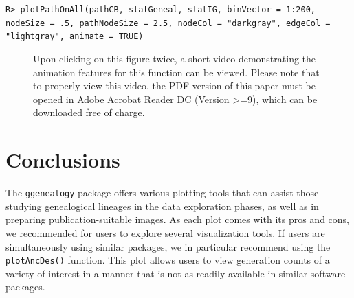 \documentclass[11pt,a4paper,oldfontcommands,openany]{memoir}
\DeclareRobustCommand{\mybox}[2][gray!15]{%
\begin{tcolorbox}[   %
        breakable,
        left=0pt,
        right=0pt,
        top=0pt,
        bottom=0pt,
        colback=#1,
        colframe=#1,
        width=\dimexpr\textwidth\relax, 
        enlarge left by=0mm,
        boxsep=5pt,
        arc=0pt,outer arc=0pt,
        ]
        #2
\end{tcolorbox}
}
\numberwithin{equation}{section} %
\newcommand{\code}[1]{{\texttt{#1}}}
\newcommand{\pkg}[1]{{\texttt{#1}}}
\begin{document}
\mybox{
\texttt{R> plotPathOnAll(pathCB, statGeneal, statIG, binVector = 1:200, nodeSize = .5, pathNodeSize = 2.5, nodeCol = "darkgray", edgeCol = "lightgray", animate = TRUE)}
}

\clearpage

\begin{figure}[H]
    \begin{framed}
    \centering
    \end{framed}
    \caption{Upon clicking on this figure twice, a short video demonstrating the animation features for this function can be viewed. Please note that to properly view this video, the PDF version of this paper must be opened in Adobe Acrobat Reader DC (Version >=9), which can be downloaded free of charge.}
    \label{fig:plotAnimate}
\end{figure}

\section{Conclusions}

The \pkg{ggenealogy} package offers various plotting tools that can assist those studying genealogical lineages in the data exploration phases, as well as in preparing publication-suitable images. As each plot comes with its pros and cons, we recommended for users to explore several visualization tools. If users are simultaneously using similar packages, we in particular recommend using the \code{plotAncDes()} function. This plot allows users to view generation counts of a variety of interest in a manner that is not as readily available in similar software packages.
\end{document}
